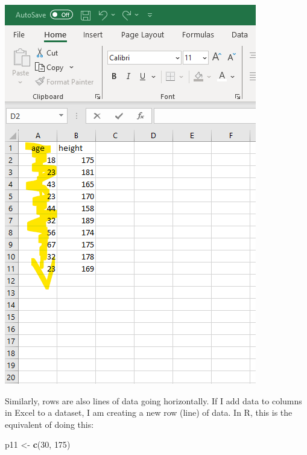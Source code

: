 \documentclass[
]{book}
\newenvironment{Shaded}{\begin{snugshade}}{\end{snugshade}}
\newcommand{\DecValTok}[1]{\textcolor[rgb]{0.00,0.00,0.81}{#1}}
\newcommand{\FunctionTok}[1]{\textcolor[rgb]{0.13,0.29,0.53}{\textbf{#1}}}
\newcommand{\NormalTok}[1]{#1}
\newcommand{\OtherTok}[1]{\textcolor[rgb]{0.56,0.35,0.01}{#1}}
\begin{document}
\includegraphics{img/03-column-vector.png}

Similarly, rows are also lines of data going horizontally. If I add data to columns in Excel to a dataset, I am creating a new row (line) of data. In R, this is the equivalent of doing this:

\begin{Shaded}
\begin{Highlighting}[]
\NormalTok{p11 }\OtherTok{\textless{}{-}} \FunctionTok{c}\NormalTok{(}\DecValTok{30}\NormalTok{, }\DecValTok{175}\NormalTok{)}
\end{Highlighting}
\end{Shaded}
\end{document}
